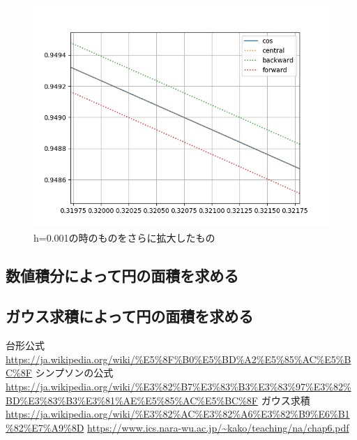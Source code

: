 \documentclass[dvipdfmx]{jsarticle}
\begin{document}
\begin{figure}[htbp]
  \centering
  \includegraphics[width=0.7\hsize]{../pics/h=0_001_ll.png}
  \caption{h=0.001の時のものをさらに拡大したもの}
  \label{fig:h_0001_ll}
\end{figure}


\subsection{数値積分によって円の面積を求める}


\subsection{ガウス求積によって円の面積を求める}


\begin{thebibliography}{10}
   台形公式
  \url{https://ja.wikipedia.org/wiki/%E5%8F%B0%E5%BD%A2%E5%85%AC%E5%BC%8F}
   シンプソンの公式
  \url{https://ja.wikipedia.org/wiki/%E3%82%B7%E3%83%B3%E3%83%97%E3%82%BD%E3%83%B3%E3%81%AE%E5%85%AC%E5%BC%8F}
   ガウス求積
  \url{https://ja.wikipedia.org/wiki/%E3%82%AC%E3%82%A6%E3%82%B9%E6%B1%82%E7%A9%8D}
  \url{https://www.ics.nara-wu.ac.jp/~kako/teaching/na/chap6.pdf}

\end{thebibliography}
\end{document}
